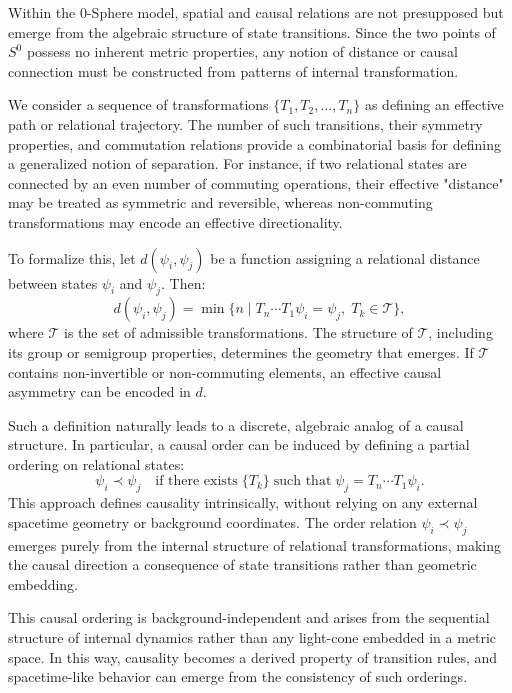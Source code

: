 \documentclass[%
 reprint,
 amsmath,amssymb,
 aps,
]{revtex4-1}
\numberwithin{equation}{section}%
\begin{document}
Within the 0-Sphere model, spatial and causal relations are not presupposed but emerge from the algebraic structure of state transitions. Since the two points of $S^0$ possess no inherent metric properties, any notion of distance or causal connection must be constructed from patterns of internal transformation.

We consider a sequence of transformations $\{T_1, T_2, \dots, T_n\}$ as defining an effective path or relational trajectory. The number of such transitions, their symmetry properties, and commutation relations provide a combinatorial basis for defining a generalized notion of separation. For instance, if two relational states are connected by an even number of commuting operations, their effective "distance" may be treated as symmetric and reversible, whereas non-commuting transformations may encode an effective directionality.

To formalize this, let $d(\psi_i, \psi_j)$ be a function assigning a relational distance between states $\psi_i$ and $\psi_j$. Then:
\begin{equation}
d(\psi_i, \psi_j) = \min \{ n \mid T_n \cdots T_1 \psi_i = \psi_j, \; T_k \in \mathcal{T} \},
\end{equation}
where $\mathcal{T}$ is the set of admissible transformations. The structure of $\mathcal{T}$, including its group or semigroup properties, determines the geometry that emerges. If $\mathcal{T}$ contains non-invertible or non-commuting elements, an effective causal asymmetry can be encoded in $d$.

Such a definition naturally leads to a discrete, algebraic analog of a causal structure. In particular, a causal order can be induced by defining a partial ordering on relational states:
\begin{equation}
\psi_i \prec \psi_j \quad \text{if there exists} \; \{T_k\} \; \text{such that} \; \psi_j = T_n \cdots T_1 \psi_i.
\end{equation}
This approach defines causality intrinsically, without relying on any external spacetime geometry or background coordinates. The order relation $\psi_i \prec \psi_j$ emerges purely from the internal structure of relational transformations, making the causal direction a consequence of state transitions rather than geometric embedding.

This causal ordering is background-independent and arises from the sequential structure of internal dynamics rather than any light-cone embedded in a metric space. In this way, causality becomes a derived property of transition rules, and spacetime-like behavior can emerge from the consistency of such orderings.
\end{document}

